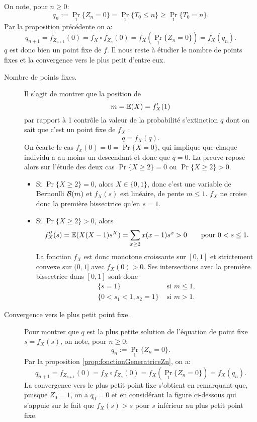 \proof
On note, pour $n \geq 0$:
$$
q_n := \Pr_1\{Z_n = 0\} = \Pr_1\{T_0 \leq n\}\geq \Pr_1\{T_0 = n\}.
$$
Par la proposition précédente on a:
$$
q_{n+1} = f_{Z_{n+1}}(0) = f_X \circ f_{Z_n} (0) = f_X(\Pr_1\{Z_n = 0\}) = f_X(q_n).
$$
$q$ est donc bien un point fixe de $f$. Il nous reste à étudier le nombre de points fixes et la convergence vers le plus petit d'entre eux.
\begin{description}
  \item[Nombre de points fixes.] Il s'agit de montrer que la position de
  $$
  m = \operatorname{\mathbb{E}}(X) = f'_X(1)
  $$
  par rapport à 1 contrôle la valeur de la probabilité s'extinction $q$ dont on sait que c'est un point fixe de $f_X$ : 
  $$
  q = f_X(q).
  $$
  On écarte le cas $f_x(0) = 0 = \Pr\{X = 0\}$, qui implique que chaque individu a au moins un descendant et donc que $q = 0$. 
  La preuve repose alors sur l'étude des deux cas $\Pr\{X\geq 2\} = 0$ ou $\Pr\{X\geq 2\} > 0$.
  \begin{itemize}
    \item Si $\Pr\{X\geq 2\} = 0$, alors $X \in \{0, 1\}$, donc c'est une variable de Bernoulli $\mathcal{B}(m)$ et $f_X(s)$ est linéaire, de pente $m \leq 1$. $f_X$ ne croise donc la première bissectrice qu'en $s = 1$.
    \item Si $\Pr\{X\geq 2\} > 0$, alors
    $$
    f''_X(s) = \operatorname{\mathbb{E}}(X(X-1) s^X) = \sum_{x \geq 2} x (x-1) s^x > 0
    \qquad \text{pour } 0 < s \leq 1.
    $$
    La fonction $f_X$ est donc monotone croissante sur $[0, 1]$ et strictement convexe sur $(0, 1]$ avec $f_X(0) > 0$. Ses intersections avec la première bissectrice dans $[0, 1]$ sont donc
    \begin{align*}
      \{s = 1\} & \text{ si } m \leq 1, \\
      \{0 < s_1 < 1, s_2=1\} & \text{ si } m > 1.
    \end{align*}
  \end{itemize}
  \item[Convergence vers le plus petit point fixe.]
  Pour montrer que $q$ est la plus petite solution de l'équation de point fixe $s = f_X(s)$, on note, pour $n \geq 0$:
  $$
  q_n := \Pr_1\{Z_n = 0\}.
  $$
  Par la proposition \ref{prop:fonctionGeneratriceZn}, on a:
  $$
  q_{n+1} = f_{Z_{n+1}}(0) = f_X \circ f_{Z_n} (0) = f_X(\Pr_1\{Z_n = 0\}) = f_X(q_n).
  $$
  La convergence vers le plus petit point fixe s'obtient en remarquant que, puisque $Z_0 = 1$, on a $q_0 = 0$ et en considérant la figure ci-dessous qui s'appuie sur le fait que $f_X(s) > s$ pour $s$ inférieur au plus petit point fixe.

\end{description}

